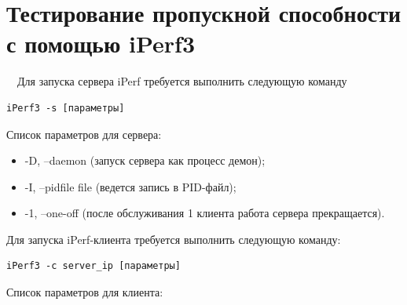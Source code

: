 \documentclass[
  13pt,
  fontsize=13pt,
  russian,
  a4paper,
,captions=tableheading
]{scrreprt}
\providecommand{\tightlist}{%
  \setlength{\itemsep}{0pt}\setlength{\parskip}{0pt}}
\begin{document}
\hypertarget{ux442ux435ux441ux442ux438ux440ux43eux432ux430ux43dux438ux435-ux43fux440ux43eux43fux443ux441ux43aux43dux43eux439-ux441ux43fux43eux441ux43eux431ux43dux43eux441ux442ux438-ux441-ux43fux43eux43cux43eux449ux44cux44e-iperf3}{%
\section{Тестирование пропускной способности с помощью
iPerf3}\label{ux442ux435ux441ux442ux438ux440ux43eux432ux430ux43dux438ux435-ux43fux440ux43eux43fux443ux441ux43aux43dux43eux439-ux441ux43fux43eux441ux43eux431ux43dux43eux441ux442ux438-ux441-ux43fux43eux43cux43eux449ux44cux44e-iperf3}}

\(\quad\)Для запуска сервера iPerf требуется выполнить следующую команду

\begin{verbatim}
iPerf3 -s [параметры]
\end{verbatim}

Список параметров для сервера:

\begin{itemize}
\tightlist
\item
  -D, --daemon (запуск сервера как процесс демон);
\item
  -I, --pidfile file (ведется запись в PID-файл);
\item
  -1, --one-off (после обслуживания 1 клиента работа сервера
  прекращается).
\end{itemize}

Для запуска iPerf-клиента требуется выполнить следующую команду:

\begin{verbatim}
iPerf3 -c server_ip [параметры]
\end{verbatim}

Список параметров для клиента:
\end{document}
